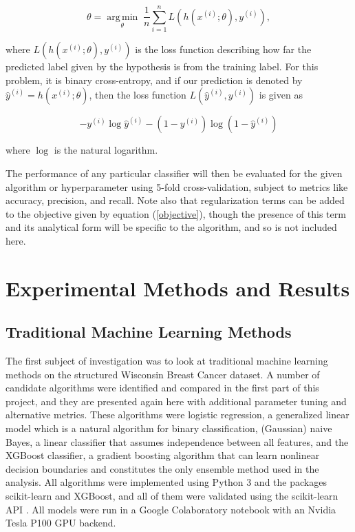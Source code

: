 \documentclass{article}
\DeclareMathOperator*{\argmin}{arg\,min}
\begin{document}
	\begin{equation}\label{objective}
	\theta = \underset{\theta}{\argmin} \; \frac{1}{n}\sum_{i=1}^{n} L\left(h(x^{(i)}; \theta), y^{(i)}\right),
	\end{equation}
	
	where $L(h(x^{(i)}; \theta), y^{(i)})$ is the loss function describing how far the predicted label given by the hypothesis is from the training label. For this problem, it is binary cross-entropy, and if our prediction is denoted by $\hat{y}^{(i)} = h(x^{(i)}; \theta)$, then the loss function $L(\hat{y}^{(i)}, y^{(i)})$ is given as
	
	\begin{equation}\label{bin-cross}
	-y^{(i)} \log \hat{y}^{(i)} - (1 - y^{(i)}) \log (1 - \hat{y}^{(i)})
	\end{equation}
	
	where $\log$ is the natural logarithm.
	
	The performance of any particular classifier will then be evaluated for the given algorithm or hyperparameter using 5-fold cross-validation, subject to metrics like accuracy, precision, and recall. Note also that regularization terms can be added to the objective given by equation (\ref{objective}), though the presence of this term and its analytical form will be specific to the algorithm, and so is not included here.
	
	\section{Experimental Methods and Results}
	\subsection{Traditional Machine Learning Methods}
	The first subject of investigation was to look at traditional machine learning methods on the structured Wisconsin Breast Cancer dataset. A number of candidate algorithms were identified and compared in the first part of this project, and they are presented again here with additional parameter tuning and alternative metrics. These algorithms were logistic regression, a generalized linear model which is a natural algorithm for binary classification, (Gaussian) naive Bayes, a linear classifier that assumes independence between all features, and the XGBoost classifier, a gradient boosting algorithm that can learn nonlinear decision boundaries and constitutes the only ensemble method used in the analysis. All algorithms were implemented using Python 3 and the packages scikit-learn and XGBoost, and all of them were validated using the scikit-learn API \cite{scikit-learn, chen2016xgboost}. All models were run in a Google Colaboratory notebook with an Nvidia Tesla P100 GPU backend.
	
\end{document}
